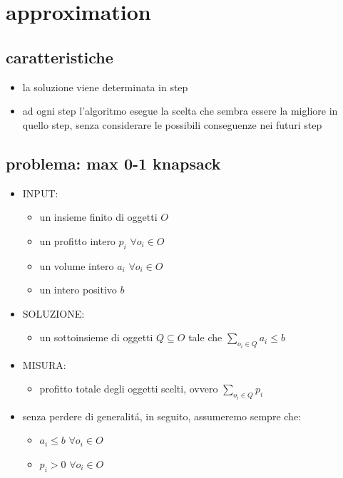 \section*{approximation}


\subsection*{caratteristiche}
\begin{flushleft}
	\begin{itemize}
		\item la soluzione viene determinata in step
		\item ad ogni step l'algoritmo esegue la scelta che sembra essere la migliore in quello step, senza considerare le possibili conseguenze nei futuri step
	\end{itemize}
\end{flushleft}


\subsection*{problema: max 0-1 knapsack}
\begin{flushleft}
	\begin{itemize}
		\item INPUT:
		\begin{itemize}
			\item un insieme finito di oggetti $O$
			\item un profitto intero $p_i$ $\forall o_i\in O$
			\item un volume intero $a_i$ $\forall o_i\in O$
			\item un intero positivo $b$
		\end{itemize}
		\item SOLUZIONE:
		\begin{itemize}
			\item un sottoinsieme di oggetti $Q\subseteq O$ tale che $\sum_{o_i\in Q}a_i\leq b$
		\end{itemize}
		\item MISURA:
		\begin{itemize}
			\item profitto totale degli oggetti scelti, ovvero $\sum_{o_i\in Q}p_i$
		\end{itemize}
		\vspace{0.5cm}
		\item senza perdere di generalit\'a, in seguito, assumeremo sempre che:
		\begin{itemize}
			\item $a_i\leq b$ $\forall o_i\in O$
			\item $p_i>0$ $\forall o_i\in O$
		\end{itemize}
	\end{itemize}
\end{flushleft}

